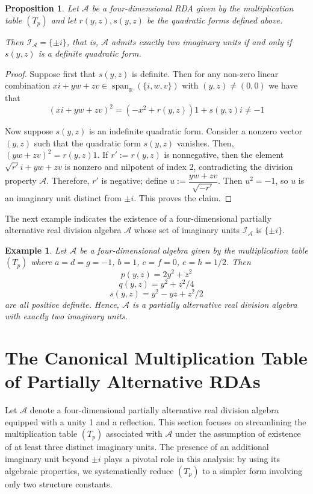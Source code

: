 \documentclass{amsart}
\theoremstyle{definition}
\theoremstyle{plain}
\newtheorem{proposition}{Proposition}
\newtheorem{example}{Example}
\begin{document}
\begin{proposition}
Let $\mathcal{A}$ be a four-dimensional RDA given by the multiplication table $(T_p)$ and let $r(y,z), s(y,z)$ be the quadratic forms defined above. 

Then $\mathcal I_\mathcal{A}=\{\pm i\}$, that is, $\mathcal{A}$ admits exactly two imaginary units if and only if $s(y,z)$ is a definite quadratic form.  
\end{proposition}
\begin{proof}
Suppose first that $s(y,z)$ is definite.  Then for any non-zero linear combination $xi+yw+zv\in\operatorname{span}_{\mathbb R}(\{i,w,v\})$ with $(y,z)\neq (0,  0)$ we have that
$$(xi+yw+zv)^2=(-x^2+r(y,z))1+ s(y,z)i\neq -1$$

Now suppose $s(y,z)$ is an indefinite quadratic form. Consider a nonzero vector $(y,z)$ such that the quadratic form $s(y,z)$ vanishes. Then, $(yw+zv)^2= r(y,z)1$. If $r':=r(y,z)$ is nonnegative, then the element $\sqrt{r'}i+yw+zv$ is nonzero and nilpotent of index $2$, contradicting the division property $\mathcal{A}$. Therefore, $r'$ is negative; define $u:=\dfrac{yw+zv}{\sqrt{-r'}}$. Then $u^2=-1$, so $u$ is an imaginary unit distinct from $\pm i$. This proves the claim.
\end{proof}

The next example indicates the existence of a four-dimensional partially alternative real division algebra $\mathcal{A}$ whose set of imaginary units $\mathcal{I_A}$ is $\{\pm i\}$.
\begin{example}
Let $\mathcal{A}$ be a four-dimensional algebra given by the multiplication table $(T_p)$ where $a=d=g=-1$, $b=1$, $c=f=0$, $e=h=1/2$. Then
$$p(y,z)=2y^2+z^2$$
$$q(y,z)=y^2+z^2/4$$
$$s(y,z)=y^2-yz+z^2/2$$
are all positive definite. Hence, $\mathcal{A}$ is a partially alternative real division algebra with exactly two imaginary units.
\end{example}














\section{The Canonical Multiplication Table of Partially Alternative RDAs}

Let $\mathcal A$  denote a four-dimensional partially alternative real division algebra equipped with a unity
1 and a reflection. This section focuses on streamlining the multiplication table $(T_p)$  associated with 
$\mathcal A$ under the assumption of existence of at least three distinct imaginary units. The presence of an additional imaginary unit beyond 
$\pm i$ plays a pivotal role in this analysis: by using its algebraic properties, we systematically reduce 
$(T_p)$ to a simpler form involving only two structure constants. 
\end{document}

